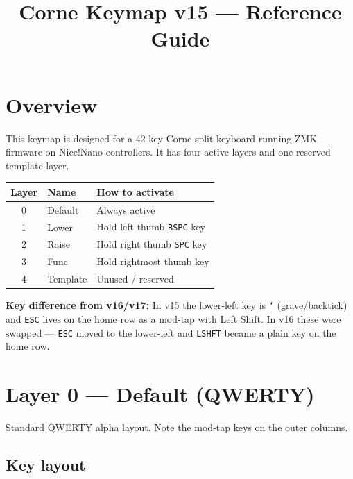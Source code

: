 \documentclass[11pt, letterpaper]{article}
\title{\textbf{Corne Keymap v15 — Reference Guide}}
\author{}
\date{}
\begin{document}
\maketitle
\tableofcontents
\newpage

\section{Overview}

This keymap is designed for a 42-key Corne split keyboard running ZMK
firmware on Nice!Nano controllers. It has four active layers and one
reserved template layer.

\begin{center}
\begin{tabular}{cll}
\toprule
\textbf{Layer} & \textbf{Name}    & \textbf{How to activate} \\
\midrule
0              & Default          & Always active \\
1              & Lower            & Hold left thumb \texttt{BSPC} key \\
2              & Raise            & Hold right thumb \texttt{SPC} key \\
3              & Func             & Hold rightmost thumb key \\
4              & Template         & Unused / reserved \\
\bottomrule
\end{tabular}
\end{center}

\noindent\textbf{Key difference from v16/v17:} In v15 the lower-left key is
\texttt{`} (grave/backtick) and \texttt{ESC} lives on the home row as a
mod-tap with Left Shift. In v16 these were swapped — \texttt{ESC} moved
to the lower-left and \texttt{LSHFT} became a plain key on the home row.

\section{Layer 0 — Default (QWERTY)}

Standard QWERTY alpha layout. Note the mod-tap keys on the outer columns.

\subsection*{Key layout}
\end{document}
